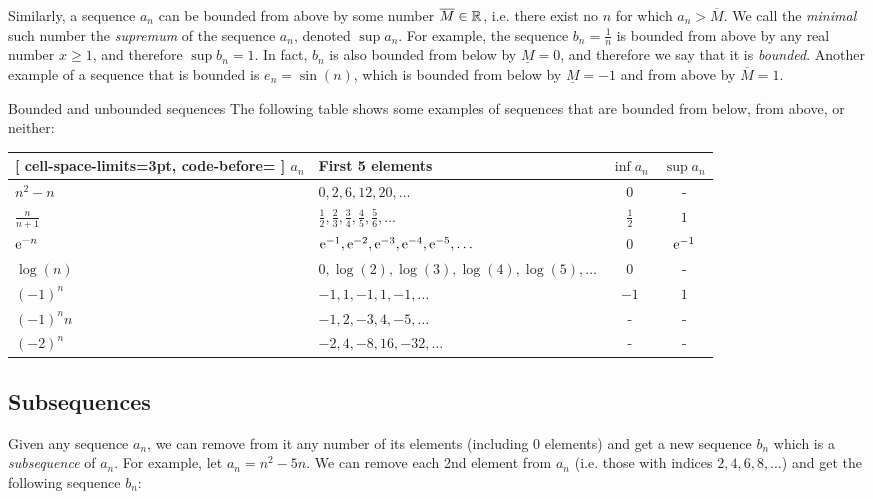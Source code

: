 Similarly, a sequence $a_{n}$ can be bounded from above by some number $\overline{M}\in\mathbb{R}^{}$, i.e. there exist no $n$ for which $a_{n}>\overline{M}$. We call the \textit{minimal} such number the \emph{supremum} of the sequence $a_{n}$, denoted $\sup a_{n}$. For example, the sequence $b_{n}=\frac{1}{n}$ is bounded from above by any real number $x\geq1$, and therefore $\sup b_{n}=1$. In fact, $b_{n}$ is also bounded from below by $\underline{M}=0$, and therefore we say that it is \emph{bounded}. Another example of a sequence that is bounded is $e_{n}=\sin(n)$, which is bounded from below by $\underline{M}=-1$ and from above by $\overline{M}=1$.

\begin{example}{Bounded and unbounded sequences}{}
	The following table shows some examples of sequences that are bounded from below, from above, or neither:

	\begin{center}
		\begin{NiceTabular}{llcc}[
			cell-space-limits=3pt, code-before= 
			]
			\toprule
			\RowStyle{\bfseries} $a_{n}$ & First 5 elements & $\inf a_{n}$ & $\sup a_{n}$\\
			\midrule
			$n^{2}-n$ & $0,2,6,12,20,\dots$ & $0$ & - \\
			$\frac{n}{n+1}$ & $\frac{1}{2},\frac{2}{3},\frac{3}{4},\frac{4}{5},\frac{5}{6},\dots$ & $\frac{1}{2}$ & $1$ \\
			$\mathrm{e}^{-n}$ & $\mathrm{e}^{-1},\mathrm{e}^{-2},\mathrm{e}^{-3},\mathrm{e}^{-4},\mathrm{e}^{-5},\ldots$ & $0$ & $\mathrm{e}^{-1}$\\
			$\log(n)$ & $0,\log(2),\log(3),\log(4),\log(5),\dots$ & $0$ & - \\
			$(-1)^{n}$ & $-1,1,-1,1,-1,\dots$ & $-1$ & $1$\\
			$(-1)^{n}n$ & $-1,2,-3,4,-5,\ldots$ & - & - \\
			$(-2)^{n}$ & $-2,4,-8,16,-32,\dots$ & - & - \\
			\bottomrule
		\end{NiceTabular}
	\end{center}
\end{example}

\subsection{Subsequences}
Given any sequence $a_{n}$, we can remove from it any number of its elements (including $0$ elements) and get a new sequence $b_{n}$ which is a \emph{subsequence} of $a_{n}$. For example, let $a_{n}=n^{2}-5n$. We can remove each 2nd element from $a_{n}$ (i.e. those with indices $2,4,6,8,\ldots$) and get the following sequence $b_{n}$:

